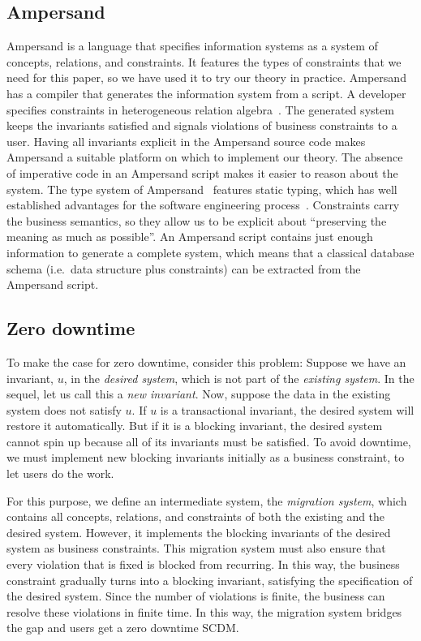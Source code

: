\documentclass[runningheads]{llncs}
\def\define#1{\label{dfn:#1}{\em #1}\index{#1}}
\begin{document}
\subsection{Ampersand}
   Ampersand is a language that specifies information systems as a system of concepts, relations, and constraints.
   It features the types of constraints that we need for this paper, so we have used it to try our theory in practice.
   Ampersand has a compiler that generates the information system from a script.
   A developer specifies constraints in heterogeneous relation algebra~\cite{Hattensperger1999,Alloy2006}.
   The generated system keeps the invariants satisfied and signals violations of business constraints to a user.
   Having all invariants explicit in the Ampersand source code makes Ampersand a suitable platform on which to implement our theory.
   The absence of imperative code in an Ampersand script makes it easier to reason about the system.
   The type system of Ampersand~\cite{vdWoude2011} features static typing,
   which has well established advantages for the software engineering process~\cite{HanenbergKRTS14,Petersen2014}.
   Constraints carry the business semantics, so they allow us to be explicit about ``preserving the meaning as much as possible''.
   An Ampersand script contains just enough information to generate a complete system,
   which means that a classical database schema (i.e.\ data structure plus constraints) can be extracted from the Ampersand script.

\subsection{Zero downtime}
   To make the case for zero downtime, consider this problem:
   Suppose we have an invariant, $u$, in the {\em desired system}, which is not part of the {\em existing system}.
   In the sequel, let us call this a {\em new invariant}.
   Now, suppose the data in the existing system does not satisfy $u$.
   If $u$ is a transactional invariant, the desired system will restore it automatically.
   But if it is a blocking invariant, the desired system cannot spin up because all of its invariants must be satisfied.
   To avoid downtime, we must implement new blocking invariants initially as a business constraint,
   to let users do the work.

   For this purpose, we define an intermediate system, the \define{migration system},
   which contains all concepts, relations, and constraints of both the existing and the desired system.
   However, it implements the blocking invariants of the desired system as business constraints.
   This migration system must also ensure that every violation that is fixed is blocked from recurring.
   In this way, the business constraint gradually turns into a blocking invariant, satisfying the specification of the desired system.
   Since the number of violations is finite, the business can resolve these violations in finite time.
   In this way, the migration system bridges the gap and users get a zero downtime SCDM.
\end{document}
